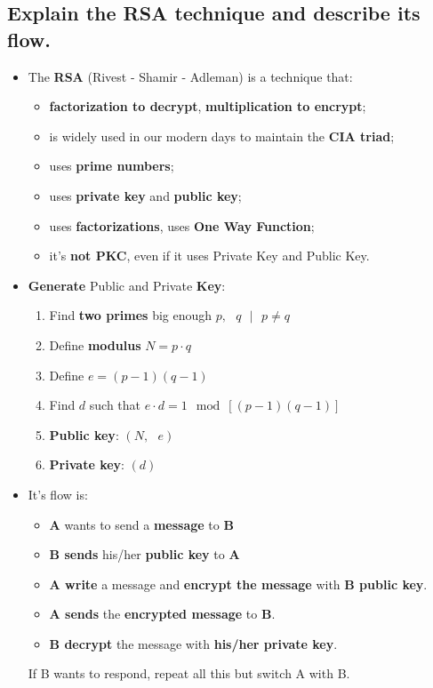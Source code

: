 \documentclass[9pt, letterpaper]{article}
\begin{document}
\newpage

\subsection{Explain the RSA technique and describe its flow.}
\begin{itemize}
	\item The \textbf{RSA} (Rivest - Shamir - Adleman) is a technique that:
	      \begin{itemize}
		      \item \textbf{factorization to decrypt}, \textbf{multiplication to encrypt};
		      \item is widely used in our modern days to maintain the \textbf{CIA triad};
		      \item uses \textbf{prime numbers};
		      \item uses \textbf{private key} and \textbf{public key};
		      \item uses \textbf{factorizations}, uses \textbf{One Way Function};
		      \item it's \textbf{not PKC}, even if it uses Private Key and Public Key.
	      \end{itemize}
	\item \textbf{Generate} Public and Private \textbf{Key}:
	      \begin{enumerate}
		      \item Find \textbf{two primes} big enough $p,\mbox{ }q \mbox{ }|\mbox{ } p\ne q$
		      \item Define \textbf{modulus} $N= p \cdot q$
		      \item Define $e= (p-1)(q-1)$
		      \item Find $d$ such that $e \cdot d = 1 \mod [(p-1)(q-1)]$
		      \item \textbf{Public key}: $(N,\mbox{ }e)$
		      \item \textbf{Private key}: $(d)$
	      \end{enumerate}
	\item It's flow is:
	      \begin{itemize}
		      \item \textbf{A} wants to send a \textbf{message} to \textbf{B}
		      \item \textbf{B sends} his/her \textbf{public key} to \textbf{A}
		      \item \textbf{A write} a message and \textbf{encrypt the message} with \textbf{B public key}.
		      \item \textbf{A sends} the \textbf{encrypted message} to \textbf{B}.
		      \item \textbf{B decrypt} the message with \textbf{his/her private key}.
	      \end{itemize}
	      If B wants to respond, repeat all this but switch A with B.
\end{itemize}
\end{document}
